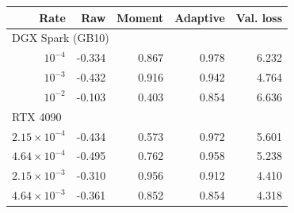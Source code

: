 \begin{tabular}{rrrrr}
\hline
Rate & Raw & Moment & Adaptive & Val. loss \\
\hline
\multicolumn{5}{l}{DGX Spark (GB10)} \\
$10^{-4}$ & -0.334 & 0.867 & 0.978 & 6.232 \\
$10^{-3}$ & -0.432 & 0.916 & 0.942 & 4.764 \\
$10^{-2}$ & -0.103 & 0.403 & 0.854 & 6.636 \\
\hline
\multicolumn{5}{l}{RTX 4090} \\
$2.15\!\times\!10^{-4}$ & -0.434 & 0.573 & 0.972 & 5.601 \\
$4.64\!\times\!10^{-4}$ & -0.495 & 0.762 & 0.958 & 5.238 \\
$2.15\!\times\!10^{-3}$ & -0.310 & 0.956 & 0.912 & 4.410 \\
$4.64\!\times\!10^{-3}$ & -0.361 & 0.852 & 0.854 & 4.318 \\
\hline
\end{tabular}
